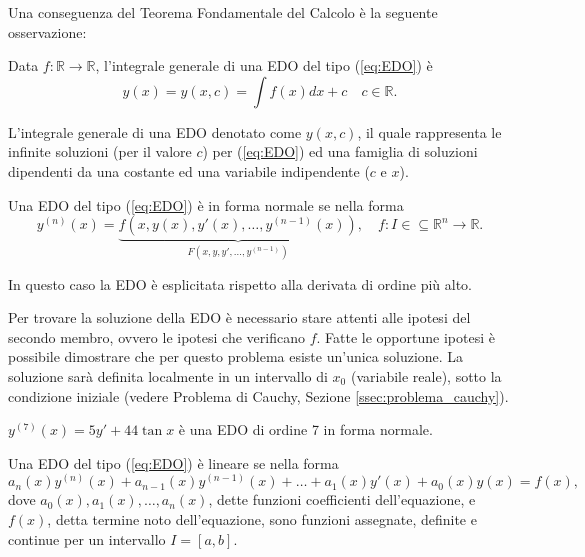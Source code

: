 Una conseguenza del Teorema Fondamentale del Calcolo è la seguente osservazione:
\begin{remark}
    Data $f\colon\mathbb R \rightarrow \mathbb R$, l'integrale generale di una EDO del tipo (\ref{eq:EDO}) è
    \begin{equation*}%
        y(x)=y(x,c)=\int f(x) dx+c\quad c\in\mathbb R.
    \end{equation*}
\end{remark} 

L'integrale generale di una EDO denotato come $y(x,c)$, il quale rappresenta le infinite soluzioni (per il valore $c$) per (\ref{eq:EDO}) ed una famiglia di soluzioni dipendenti da una costante ed una variabile indipendente ($c$ e $x$).

\begin{definition}
    Una EDO del tipo (\ref{eq:EDO}) è in forma normale se nella forma
    \begin{equation}\label{eq:EDO_forma_normale}
        y^{(n)}(x)=\underbrace{f(x, y(x), y'(x),\hdots,y^{(n-1)}(x))}_{F(x, y, y',\hdots, y^{(n-1)})}, \quad f\colon I\in\subseteq\mathbb R^{n}\rightarrow\mathbb R.
    \end{equation}
\end{definition}

In questo caso la EDO è esplicitata rispetto alla derivata di ordine più alto.

Per trovare la soluzione della EDO è necessario stare attenti alle ipotesi del secondo membro, ovvero le ipotesi che verificano $f$. Fatte le opportune ipotesi è possibile dimostrare che per questo problema esiste un'unica soluzione. La soluzione sarà definita localmente in un intervallo di $x_0$ (variabile reale), sotto la condizione iniziale (vedere Problema di Cauchy, Sezione \ref{ssec:problema_cauchy}).

\begin{example}
    $y^{(7)}(x)=5y'+44\tan x$ è una EDO di ordine 7 in forma normale.
\end{example}
\begin{definition}
    Una EDO del tipo (\ref{eq:EDO}) è lineare se nella forma
    \begin{equation}\label{eq:EDO_lineare_ordine_n}
        a_n(x)y^{(n)}(x)+a_{n-1}(x)y^{(n-1)}(x)+\hdots+a_1(x)y'(x)+a_0(x)y(x)=f(x),
    \end{equation}
    dove $a_0(x),a_1(x),\hdots, a_n(x)$, dette funzioni coefficienti dell'equazione, e  $f(x)$, detta termine noto dell'equazione, sono funzioni assegnate, definite e continue per un intervallo $I=[a,b]$.
\end{definition}

